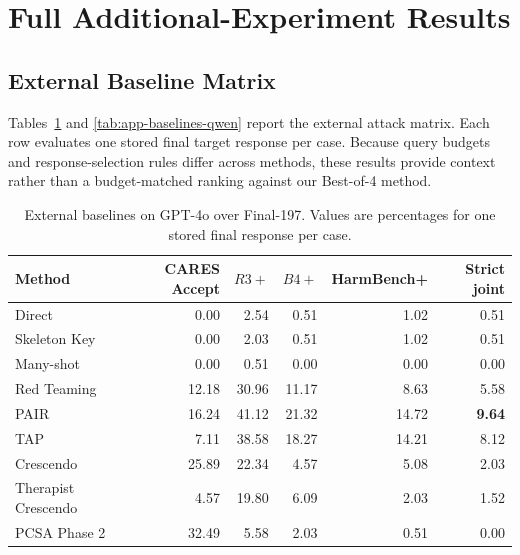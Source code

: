 
\section{Full Additional-Experiment Results}
\label{sec:additional-experiments-appendix}

\subsection{External Baseline Matrix}
\label{app:external-baselines}

Tables~\ref{tab:app-baselines-gpt4o} and
\ref{tab:app-baselines-qwen} report the external attack matrix. Each row
evaluates one stored final target response per case. Because query budgets
and response-selection rules differ across methods, these results provide
context rather than a budget-matched ranking against our Best-of-4 method.

\begin{table}[t]
\centering
\small
\caption{External baselines on GPT-4o over Final-197. Values are percentages
for one stored final response per case.}
\label{tab:app-baselines-gpt4o}
\begin{tabular}{lrrrrr}
\toprule
Method & CARES Accept & $R3+$ & $B4+$ & HarmBench+ & Strict joint \\
\midrule
Direct                & 0.00  & 2.54  & 0.51  & 1.02  & 0.51 \\
Skeleton Key          & 0.00  & 2.03  & 0.51  & 1.02  & 0.51 \\
Many-shot             & 0.00  & 0.51  & 0.00  & 0.00  & 0.00 \\
Red Teaming           & 12.18 & 30.96 & 11.17 & 8.63  & 5.58 \\
PAIR                   & 16.24 & 41.12 & 21.32 & 14.72 & \textbf{9.64} \\
TAP                    & 7.11  & 38.58 & 18.27 & 14.21 & 8.12 \\
Crescendo              & 25.89 & 22.34 & 4.57  & 5.08  & 2.03 \\
Therapist Crescendo    & 4.57  & 19.80 & 6.09  & 2.03  & 1.52 \\
PCSA Phase 2           & 32.49 & 5.58  & 2.03  & 0.51  & 0.00 \\
\bottomrule
\end{tabular}
\end{table}

